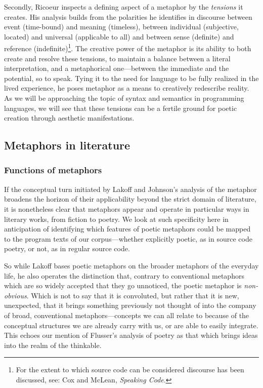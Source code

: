 \documentclass{article}
\begin{document}
Secondly, Ricoeur inspects a defining aspect of a metaphor by the \emph{tensions} it creates. His analysis builds from the polarities he identifies in discourse between event (time-bound) and meaning (timeless), between individual (subjective, located) and universal (applicable to all) and between sense (definite) and reference (indefinite)\footnote{For the extent to which source code can be considered discourse has been discussed, see: Cox and McLean, \emph{Speaking Code}.}. The creative power of the metaphor is its ability to both create and resolve these tensions, to maintain a balance between a literal interpretation, and a metaphorical one—between the immediate and the potential, so to speak. Tying it to the need for language to be fully realized in the lived experience, he poses metaphor as a means to creatively redescribe reality. As we will be approaching the topic of syntax and semantics in programming languages, we will see that these tensions can be a fertile ground for poetic creation through aesthetic manifestations.

\vspace{1\baselineskip}

\subsection{Metaphors in literature}

\subsubsection{Functions of metaphors}

If the conceptual turn initiated by Lakoff and Johnson's analysis of the metaphor broadens the horizon of their applicability beyond the strict domain of literature, it is nonetheless clear that metaphors appear and operate in particular ways in literary works, from fiction to poetry. We look at such specificity here in anticipation of identifying which features of poetic metaphors could be mapped to the program texts of our corpus—whether explicitly poetic, as in source code poetry, or not, as in regular source code.

So while Lakoff bases poetic metaphors on the broader metaphors of the everyday life, he also operates the distinction that, contrary to conventional metaphors which are so widely accepted that they go unnoticed, the poetic metaphor is \emph{non-obvious}. Which is not to say that it is convoluted, but rather that it is new, unexpected, that it brings something previously not thought of into the company of broad, conventional metaphors—concepts we can all relate to because of the conceptual structures we are already carry with us, or are able to easily integrate. This echoes our mention of Flusser's analysis of poetry as that which brings ideas into the realm of the thinkable.
\end{document}
